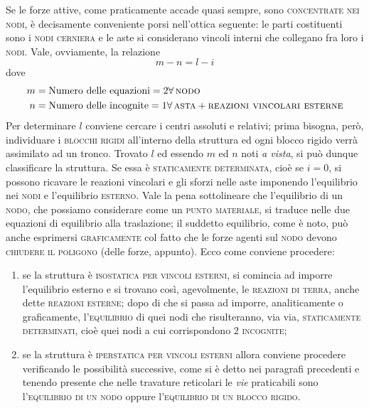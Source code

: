 \noindent Se le forze attive, come praticamente accade quasi sempre, sono \textsc{concentrate nei nodi}, è decisamente conveniente porsi nell'ottica seguente: le parti costituenti sono i \textsc{nodi cerniera} e le aste si considerano vincoli interni che collegano fra loro i \textsc{nodi}. Vale, ovviamente, la relazione 
\begin{equation*}
m-n = l-i
\end{equation*}
dove
\begin{align*}
m &= \textup{Numero delle equazioni} = 2\forall\,\textup{\textsc{nodo}} \\
n &= \textup{Numero delle incognite} = 1\forall\,\textup{\textsc{asta}}+\textup{\textsc{reazioni vincolari esterne}}
\end{align*}
Per determinare $l$ conviene cercare i centri assoluti e relativi; prima bisogna, però, individuare i \textsc{blocchi rigidi} all'interno della struttura ed ogni blocco rigido verrà assimilato ad un tronco. Trovato $l$ ed essendo $m$ ed $n$ noti \emph{a vista}, si può dunque classificare la struttura. Se essa è \textsc{staticamente determinata}, cioè se $i=0$, si possono ricavare le reazioni vincolari e gli sforzi nelle aste imponendo l'equilibrio nei \textsc{nodi} e l'equilibrio \textsc{esterno}. Vale la pena sottolineare che l'equilibrio di un \textsc{nodo}, che possiamo considerare come un \textsc{punto materiale}, si traduce nelle due equazioni di equilibrio alla traslazione; il suddetto equilibrio, come è noto, può anche esprimersi \textsc{graficamente} col fatto che le forze agenti sul \textsc{nodo} devono \textsc{chiudere il poligono} (delle forze, appunto). Ecco come conviene procedere: 
\begin{enumerate}
\item se la struttura è \textsc{isostatica per vincoli esterni}, si comincia ad imporre l'equilibrio esterno e si trovano così, agevolmente, le \textsc{reazioni di terra}, anche dette \textsc{reazioni esterne}; dopo di che si passa ad imporre, analiticamente o graficamente, l'\textsc{equilibrio} di quei nodi che risulteranno, via via, \textsc{staticamente determinati}, cioè quei nodi a cui corrispondono $2$ \textsc{incognite};
\item se la struttura è \textsc{iperstatica per vincoli esterni} allora conviene procedere verificando le possibilità successive, come si è detto nei paragrafi precedenti e tenendo presente che nelle travature reticolari le \emph{vie} praticabili sono l'\textsc{equilibrio di un nodo} oppure l'\textsc{equilibrio di un blocco rigido}. 
\end{enumerate}
